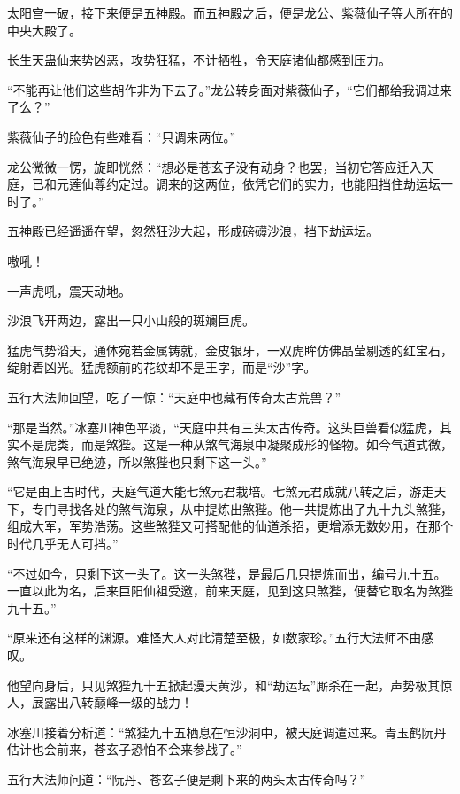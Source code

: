 
\begin{this_body}



太阳宫一破，接下来便是五神殿。而五神殿之后，便是龙公、紫薇仙子等人所在的中央大殿了。

长生天蛊仙来势凶恶，攻势狂猛，不计牺牲，令天庭诸仙都感到压力。

“不能再让他们这些胡作非为下去了。”龙公转身面对紫薇仙子，“它们都给我调过来了么？”

紫薇仙子的脸色有些难看：“只调来两位。”

龙公微微一愣，旋即恍然：“想必是苍玄子没有动身？也罢，当初它答应迁入天庭，已和元莲仙尊约定过。调来的这两位，依凭它们的实力，也能阻挡住劫运坛一时了。”

五神殿已经遥遥在望，忽然狂沙大起，形成磅礴沙浪，挡下劫运坛。

嗷吼！

一声虎吼，震天动地。

沙浪飞开两边，露出一只小山般的斑斓巨虎。

猛虎气势滔天，通体宛若金属铸就，金皮银牙，一双虎眸仿佛晶莹剔透的红宝石，绽射着凶光。猛虎额前的花纹却不是王字，而是“沙”字。

五行大法师回望，吃了一惊：“天庭中也藏有传奇太古荒兽？”

“那是当然。”冰塞川神色平淡，“天庭中共有三头太古传奇。这头巨兽看似猛虎，其实不是虎类，而是煞狴。这是一种从煞气海泉中凝聚成形的怪物。如今气道式微，煞气海泉早已绝迹，所以煞狴也只剩下这一头。”

“它是由上古时代，天庭气道大能七煞元君栽培。七煞元君成就八转之后，游走天下，专门寻找各处的煞气海泉，从中提炼出煞狴。他一共提炼出了九十九头煞狴，组成大军，军势浩荡。这些煞狴又可搭配他的仙道杀招，更增添无数妙用，在那个时代几乎无人可挡。”

“不过如今，只剩下这一头了。这一头煞狴，是最后几只提炼而出，编号九十五。一直以此为名，后来巨阳仙祖受邀，前来天庭，见到这只煞狴，便替它取名为煞狴九十五。”

“原来还有这样的渊源。难怪大人对此清楚至极，如数家珍。”五行大法师不由感叹。

他望向身后，只见煞狴九十五掀起漫天黄沙，和“劫运坛”厮杀在一起，声势极其惊人，展露出八转巅峰一级的战力！

冰塞川接着分析道：“煞狴九十五栖息在恒沙洞中，被天庭调遣过来。青玉鹤阮丹估计也会前来，苍玄子恐怕不会来参战了。”

五行大法师问道：“阮丹、苍玄子便是剩下来的两头太古传奇吗？”


\end{this_body}
